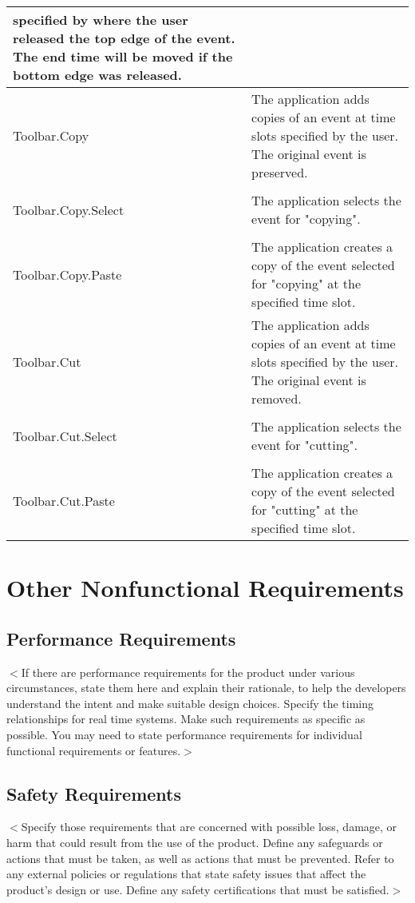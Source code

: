 \documentclass{scrreprt}
\begin{document}
\begin{center}
\begin{longtable}{ | p{6cm} | p{9cm} | }
    specified by where the user released the top edge of the event. The end time
    will be moved if the bottom edge was released.\\
    \hline
    Toolbar.Copy & The application adds copies of an event at time slots specified
    by the user. The original event is preserved.\\
    & \\
    Toolbar.Copy.Select & The application selects the event for "copying".\\
    & \\
    Toolbar.Copy.Paste & The application creates a copy of the event selected
    for "copying" at the specified time slot.\\
    \hline
    Toolbar.Cut & The application adds copies of an event at time slots specified
    by the user. The original event is removed.\\
    & \\
    Toolbar.Cut.Select & The application selects the event for "cutting".\\
    & \\
    Toolbar.Cut.Paste & The application creates a copy of the event selected
    for "cutting" at the specified time slot.\\
    \hline
    \end{longtable}
\end{center}

\chapter{Other Nonfunctional Requirements}

\section{Performance Requirements}
$<$If there are performance requirements for the product under various 
circumstances, state them here and explain their rationale, to help the 
developers understand the intent and make suitable design choices. Specify the 
timing relationships for real time systems. Make such requirements as specific 
as possible. You may need to state performance requirements for individual 
functional requirements or features.$>$

\section{Safety Requirements}
$<$Specify those requirements that are concerned with possible loss, damage, or 
harm that could result from the use of the product. Define any safeguards or 
actions that must be taken, as well as actions that must be prevented. Refer to 
any external policies or regulations that state safety issues that affect the 
product’s design or use. Define any safety certifications that must be 
satisfied.$>$
\end{document}
